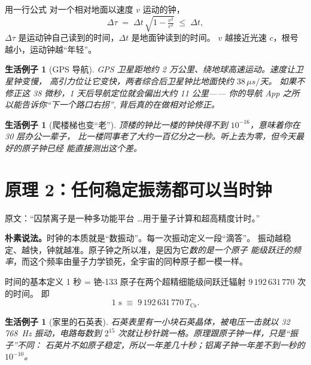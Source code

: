 \documentclass[11pt,a4paper]{ctexart}
\newtheorem{example}[principle]{生活例子}
\begin{document}
\begin{mathblock}{用一行公式}
对一个相对地面以速度 $v$ 运动的钟，
\[
  \Delta\tau \;=\; \Delta t\,\sqrt{1-\tfrac{v^{2}}{c^{2}}}
  \;\le\; \Delta t,
\]
$\Delta\tau$ 是运动钟自己读到的时间，$\Delta t$ 是地面钟读到的时间。
$v$ 越接近光速 $c$，根号越小，运动钟越``年轻''。
\end{mathblock}

\begin{example}[GPS 导航]
GPS 卫星距地约 2 万公里、绕地球高速运动。\emph{速度}让卫星钟变慢，
\emph{高引力位}让它变快，两者综合后卫星钟比地面快约 $38\,\mu s/$天。
如果不修正这 38 微秒，1 天后导航定位就会偏出大约 11 公里——
你的导航 App 之所以能告诉你``下一个路口右拐'', 背后真的在做相对论修正。
\end{example}

\begin{example}[爬楼梯也变``老'']
顶楼的钟比一楼的钟快得不到 $10^{-16}$，意味着你在 30 层办公一辈子，
比一楼同事老了大约一百亿分之一秒。听上去为零，但今天最好的原子钟已经
能直接测出这个差。
\end{example}

\section{原理 2：任何稳定振荡都可以当时钟}

\begin{newsblock}
原文：``囚禁离子是一种多功能平台 \dots 用于量子计算和超高精度计时。''
\end{newsblock}

\begin{intuitionblock}
\textbf{朴素说法。}时钟的本质就是``数振动''。每一次振动定义一段``滴答''。
振动越稳定、越快，钟就越准。原子钟之所以准，是因为它\emph{数的是一个原子
能级跃迁的频率}，而这个频率由量子力学锁死，全宇宙的同种原子都一模一样。
\end{intuitionblock}

\begin{mathblock}{时间的基本定义}
1 秒 = 铯-133 原子在两个超精细能级间跃迁辐射 $9\,192\,631\,770$ 次的时间。
即
\[
  1\text{ s}\;\equiv\; 9\,192\,631\,770\,T_{\text{Cs}}.
\]
\end{mathblock}

\begin{example}[家里的石英表]
石英表里有一小块石英晶体，被电压一击就以 32\,768~Hz 振动，电路每数到
$2^{15}$ 次就让秒针跳一格。原理跟原子钟一样，只是``振子''不同：
石英片不如原子稳定，所以一年差几十秒；铝离子钟一年差不到一秒的
$10^{-10}$。
\end{example}
\end{document}
